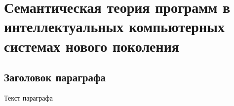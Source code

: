 \chapter{Семантическая теория программ в интеллектуальных компьютерных системах нового поколения}
\label{chapter_programs}


\section{Заголовок параграфа}
Текст параграфа

%